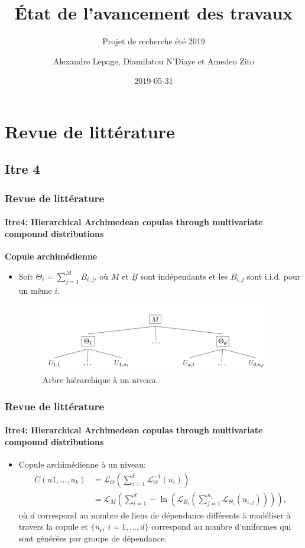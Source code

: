 \documentclass[11pt]{beamer}
\title[]{État de l'avancement des travaux}
\subtitle[]{Projet de recherche été 2019}
\author[Lepage A., N'Diaye D. et Zito A.]{Alexandre Lepage, Diamilatou N'Diaye \newline et Amedeo Zito}
\institute[ULaval] %
{
  École d'actuariat \\
  Université Laval, Québec, Canada \\
}
\date{2019-05-31} %
\begin{document}
\begin{frame}[label=titre, plain]
\titlepage
\end{frame}


\section{Revue de littérature}
\subsection{Itre 4}
\begin{frame}
	\frametitle{Revue de littérature}
	\framesubtitle{Itre4: Hierarchical Archimedean copulas through multivariate compound
		distributions \cite{Itre4}}
	
	\textbf{Copule archimédienne}
	
	\begin{itemize}
		\item Soit $\Theta_i = \sum_{j=1}^{M} B_{i,j}$, où $M$ et $\underline{B}$ sont indépendants et les $B_{i,j}$ sont i.i.d. pour un même $i$.
		\begin{figure}[H]
			\centering
			\includegraphics[height=3cm]{Hierarchie_1}
			\renewcommand{\figurename}{Illustration}
			\caption{Arbre hiérarchique à un niveau.}\label{hierarchie}
		\end{figure}
	
	\end{itemize}
\end{frame}


\begin{frame}
	\frametitle{Revue de littérature}
	\framesubtitle{Itre4: Hierarchical Archimedean copulas through multivariate compound
		distributions \cite{Itre4}}
	\begin{itemize}
		\item Copule archimédienne à un niveau:
		\begin{align}
			C(u1, ... , u_k) 
			&= \mathcal{L}_{\Theta}\left(
				\sum_{i=1}^{k} \mathcal{L}_{\Theta}^{-1} (u_i) \right) \nonumber \\
			&= \mathcal{L}_{M}\left(
				\sum_{i=1}^{d} - \ln \left(
				 \mathcal{L}_{B_i}\left(
				  \sum_{j=1}^{n_i} \mathcal{L}_{\Theta_i} (u_{i,j})
				\right) \right)\right), \label{Copule_Archimedienne}
		\end{align}
		où $d$ correspond au nombre de liens de dépendance différents à modéliser à travers la copule et $\{n_i,\ i=1,...,d\}$ correspond au nombre d'uniformes qui sont générées par groupe de dépendance.
		
	\end{itemize}

\end{frame}
\end{document}
